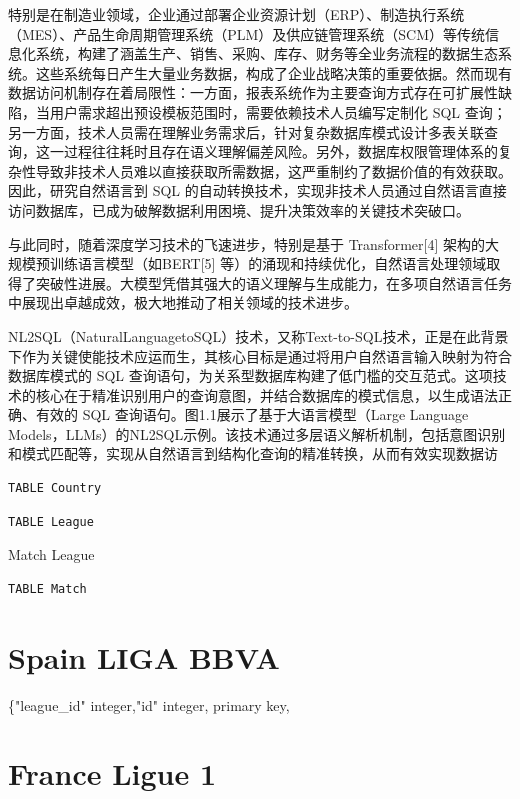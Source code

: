 \documentclass[12pt,a4paper,openright,UTF8]{ctexbook}
\begin{document}
特别是在制造业领域，企业通过部署企业资源计划（ERP）、制造执行系统（MES）、产品生命周期管理系统（PLM）及供应链管理系统（SCM）等传统信息化系统，构建了涵盖生产、销售、采购、库存、财务等全业务流程的数据生态系统。这些系统每日产生大量业务数据，构成了企业战略决策的重要依据。然而现有数据访问机制存在着局限性：一方面，报表系统作为主要查询方式存在可扩展性缺陷，当用户需求超出预设模板范围时，需要依赖技术人员编写定制化 SQL 查询；另一方面，技术人员需在理解业务需求后，针对复杂数据库模式设计多表关联查询，这一过程往往耗时且存在语义理解偏差风险。另外，数据库权限管理体系的复杂性导致非技术人员难以直接获取所需数据，这严重制约了数据价值的有效获取。因此，研究自然语言到 SQL 的自动转换技术，实现非技术人员通过自然语言直接访问数据库，已成为破解数据利用困境、提升决策效率的关键技术突破口。


与此同时，随着深度学习技术的飞速进步，特别是基于 Transformer[4] 架构的大规模预训练语言模型（如BERT[5] 等）的涌现和持续优化，自然语言处理领域取得了突破性进展。大模型凭借其强大的语义理解与生成能力，在多项自然语言任务中展现出卓越成效，极大地推动了相关领域的技术进步。


NL2SQL（NaturalLanguagetoSQL）技术，又称Text-to-SQL技术，正是在此背景下作为关键使能技术应运而生，其核心目标是通过将用户自然语言输入映射为符合数据库模式的 SQL 查询语句，为关系型数据库构建了低门槛的交互范式。这项技术的核心在于精准识别用户的查询意图，并结合数据库的模式信息，以生成语法正确、有效的 SQL 查询语句。图1.1展示了基于大语言模型（Large Language Models，LLMs）的NL2SQL示例。该技术通过多层语义解析机制，包括意图识别和模式匹配等，实现从自然语言到结构化查询的精准转换，从而有效实现数据访

\begin{lstlisting}
TABLE Country
\end{lstlisting}


\begin{lstlisting}
TABLE League
\end{lstlisting}

Match League

\begin{lstlisting}
TABLE Match
\end{lstlisting}


\chapter{Spain LIGA BBVA}

\{"league\_id" integer,"id" integer, primary key,

\chapter{France Ligue 1}
\end{document}
